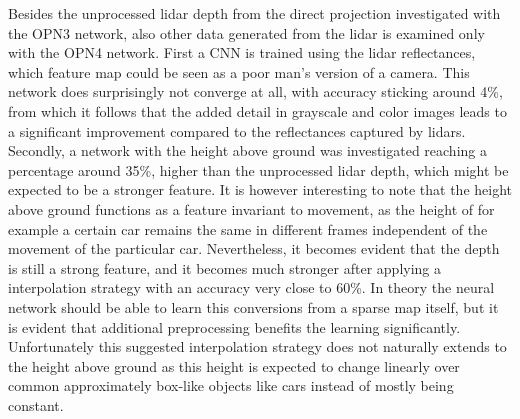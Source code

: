 Besides the unprocessed lidar depth from the direct projection investigated with the OPN3 network, also other data generated from the lidar is examined only with the OPN4 network. First a CNN is trained using the lidar reflectances, which feature map could be seen as a poor man's version of a camera. This network does surprisingly not converge at all, with accuracy sticking around 4\%, from which it follows that the added detail in grayscale and color images leads to a significant improvement compared to the reflectances captured by lidars. Secondly, a network with the height above ground was investigated reaching a percentage around 35\%, higher than the unprocessed lidar depth, which might be expected to be a stronger feature. It is however interesting to note that the height above ground functions as a feature invariant to movement, as the height of for example a certain car remains the same in different frames independent of the movement of the particular car. Nevertheless, it becomes evident that the depth is still a strong feature, and it becomes much stronger after applying a interpolation strategy with an accuracy very close to 60\%. In theory the neural network should be able to learn this conversions from a sparse map itself, but it is evident that additional preprocessing benefits the learning significantly. Unfortunately this suggested interpolation strategy does not naturally extends to the height above ground as this height is expected to change linearly over common approximately box-like objects like cars instead of mostly being constant. 




